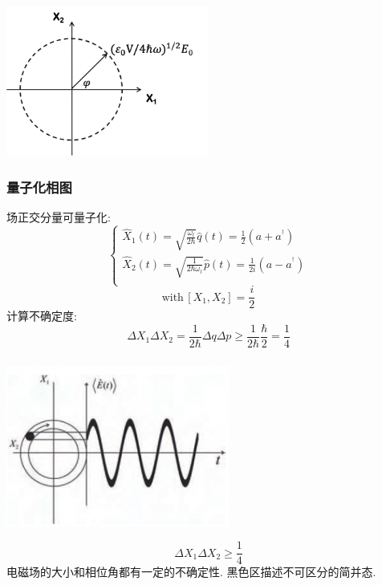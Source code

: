 \begin{frame}
  \begin{center}
     \includegraphics[width=0.5\textwidth]{figs/3.png}
  \end{center}
\end{frame}


\begin{frame}
  \frametitle{量子化相图}
  场正交分量可量子化:
  \[ \begin{cases}
    \hat{X}_{1}(t) = \sqrt{\frac{\omega_l}{2\hbar}}\hat{q}(t)=\frac{1}{2}\left(a+a^{^{\dagger}}\right)\\ 
    \hat{X}_{2}(t) = \sqrt{\frac{1}{2\hbar \omega_l}}\hat{p}(t)= \frac{1}{2 i}\left(a-a^{^{\dagger}}\right)\\ 
   \end{cases} \]
  \[ \text{with} \, [X_1, X_2] =\frac{i}{2} \]
  计算不确定度:
  \[ \Delta X_1 \Delta X_2  = \frac{1}{2\hbar}  \Delta q \Delta p \geq \frac{1}{2\hbar} \frac{\hbar}{2}=\frac{1}{4}  \]
\end{frame}

\begin{frame}
    \frametitle{} 
    \begin{center}
       \includegraphics[width=0.55\textwidth]{figs/34.png}
    \end{center}
    \[ \Delta X_1 \Delta X_2  \geq  \frac{1}{4}  \]
    电磁场的大小和相位角都有一定的不确定性. 黑色区描述不可区分的简并态. 
\end{frame}

